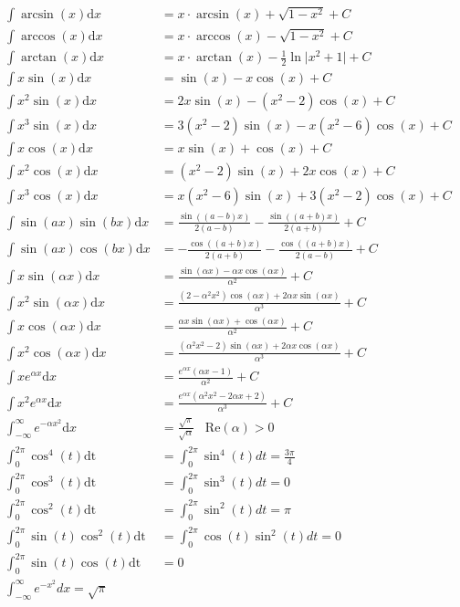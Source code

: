 \documentclass[8pt, a4paper, landscape, fleqn]{scrartcl}
\def\Re{\text{Re}}
\begin{document}
\begin{multicols*}{3}
\begin{align*}
						\int \arcsin(x)\text{d}x&= x\cdot \arcsin(x)+\sqrt{1-x^2}+C\\
						\int \arccos(x)\text{d}x&=x\cdot \arccos(x)-\sqrt{1-x^2}+C\\
						\int \arctan(x)\text{d}x&=x\cdot \arctan(x)-\frac{1}{2}\ln \vert x^2+1\vert+C\\
    					\int x \sin(x)\text{d}x&= \sin(x) - x \cos(x)+C \\
    					\int x^2 \sin(x) \text{d}x&= 2x\sin(x) -(x^2-2)\cos(x) + C \\
    					\int x^3 \sin(x)\text{d}x&= 3(x^2-2) \sin(x) - x(x^2-6)\cos(x) +C \\
    					\int x \cos(x) \text{d}x&= x\sin(x) +\cos(x) +C\\
    					\int x^2 \cos(x) \text{d}x&= (x^2-2)\sin(x) + 2x\cos(x) +C \\
    					\int x^3 \cos(x) \text{d}x&= x(x^2-6)\sin(x) + 3(x^2-2)\cos(x) +C \\
    					\int \sin(ax)\sin(bx)\text{d}x&= \frac{\sin((a-b)x)}{2(a-b)} - \frac{\sin((a+b)x)}{2(a+b)} +C \\
    					\int \sin(ax)\cos(bx)\text{d}x&= -\frac{\cos((a+b)x)}{2(a+b)} - \frac{\cos((a+b)x)}{2(a-b)} +C \\
    					\int x \sin(\alpha x) \text{d}x&= \frac{\sin(\alpha x) - \alpha x \cos(\alpha x)}{\alpha^2} + C \\
    					\int x^2 \sin(\alpha x) \text{d}x&= \frac{(2-\alpha^2x^2)\cos(\alpha x)+2\alpha x\sin(\alpha x)}{\alpha^3} +C \\
    					\int x \cos(\alpha x) \text{d}x&= \frac{\alpha x \sin(\alpha x)+\cos(\alpha x)}{\alpha^2} + C \\
    					\int x^2 \cos(\alpha x) \text{d}x&=\frac{(\alpha^2x^2-2)\sin(\alpha x)+2\alpha x \cos(\alpha x)}{\alpha^3} + C \\
    					\int x e^{\alpha x} \text{d}x&= \frac{e^{\alpha x}(\alpha x -1)}{\alpha ^2} +C \\
    					\int x^2 e^{\alpha x} \text{d}x&= \frac{e^{\alpha x}(\alpha ^2 x^2 -2\alpha x +2)}{\alpha ^3} +C \\
    					\int_{-\infty}^\infty e^{-\alpha x^2} \text{d}x&= \frac{\sqrt{\pi}}{\sqrt{\alpha}}\hspace{10pt}\Re(\alpha) > 0 \\
    					\int_0^{2\pi}\cos^4(t)\text{dt}&=\int_0^{2\pi}\sin^4(t)dt=\frac{3\pi}{4}\\
    					\int_0^{2\pi}\cos^3(t)\text{dt}&=\int_0^{2\pi}\sin^3(t)dt=0\\
    					\int_0^{2\pi}\cos^2(t)\text{dt}&=\int_0^{2\pi}\sin^2(t)dt=\pi\\
    					\int_0^{2\pi}\sin(t)\cos^2(t)\text{dt}&=\int_0^{2\pi}\cos(t)\sin^2(t)dt=0\\
    					\int_0^{2\pi}\sin(t)\cos(t)\text{dt}&=0\\
					    \int_{-\infty}^{\infty}{e^{-x^2}}dx=\sqrt{\pi}
					\end{align*}

\end{multicols*}
\end{document}
